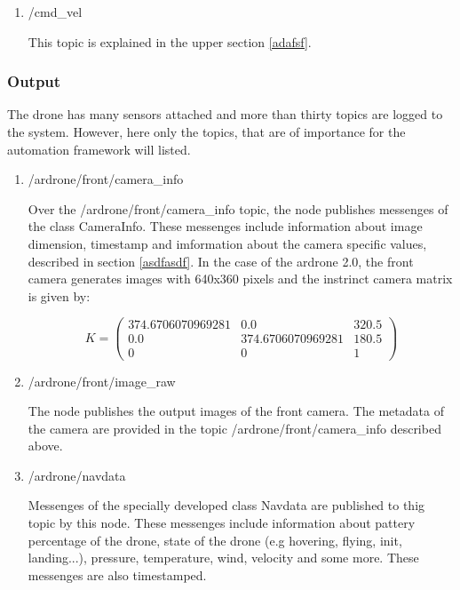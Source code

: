 	\begin{enumerate}
	\item{/cmd\_vel}
	
	This topic is explained in the upper section \ref{adafsf}.
	
	\end{enumerate}
	
	\subsubsection{Output}
	
	The drone has many sensors attached and more than thirty topics are logged to the system. However, here only the topics, that are of importance 
	for the automation framework will listed. 
	
	\begin{enumerate}
	
	\item{/ardrone/front/camera\_info}
	
	Over the /ardrone/front/camera\_info topic, the node publishes messenges of the class CameraInfo. These messenges include information about 
	image dimension, timestamp and imformation about the camera specific values, described in section \ref{asdfasdf}. In the case of the ardrone 2.0,
	the front camera generates images with 640x360 pixels and the instrinct camera matrix is given by: 
	
	$$K = \begin{pmatrix} 374.6706070969281 & 0.0 & 320.5 \\
						  0.0 & 374.6706070969281 & 180.5 \\ 
						  0 & 0 & 1 \end{pmatrix}$$
	
	\item{/ardrone/front/image\_raw}
	
	The node publishes the output images of the front camera. The metadata of the camera are provided in the topic /ardrone/front/camera\_info described above. 
	
	\item{/ardrone/navdata}
	
	Messenges of the specially developed class Navdata are published to thig topic by this node. These messenges include information about 
	pattery percentage of the drone, state of the drone (e.g hovering, flying, init, landing...), pressure, temperature, wind, velocity and 
    some more. These messenges are also timestamped. 	
	

\end{enumerate}
